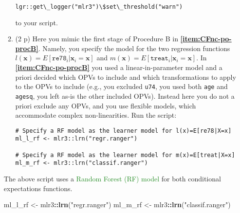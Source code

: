 \documentclass[
]{article}
\newenvironment{Shaded}{\begin{snugshade}}{\end{snugshade}}
\newcommand{\FunctionTok}[1]{\textcolor[rgb]{0.13,0.29,0.53}{\textbf{#1}}}
\newcommand{\NormalTok}[1]{#1}
\newcommand{\OtherTok}[1]{\textcolor[rgb]{0.56,0.35,0.01}{#1}}
\newcommand{\SpecialCharTok}[1]{\textcolor[rgb]{0.81,0.36,0.00}{\textbf{#1}}}
\newcommand{\StringTok}[1]{\textcolor[rgb]{0.31,0.60,0.02}{#1}}
\begin{document}
\begin{enumerate}
\begin{enumerate}
    \texttt{lgr::get\textbackslash{}\_logger("mlr3")\textbackslash{}\$set\textbackslash{}\_threshold("warn")}

    to your script.

\begin{Shaded}
\end{Shaded}
  \item
    (2 p) Here you mimic the first stage of Procedure B in
    \textbf{\ref{item:CFnc-po-procB}}. Namely, you specify the model for
    the two regression functions
    \(l(\mathbf{x})=E[\texttt{re78}_i|\mathbf{x}_{i}=\mathbf{x}]\) and
    \(m(\mathbf{x})=E[\texttt{treat}_i|\mathbf{x}_{i}=\mathbf{x}]\). In
    \textbf{\ref{item:CFnc-po-procB}} you used a linear-in-parameter
    model and a priori decided which OPVs to include and which
    transformations to apply to the OPVs to include (e.g., you excluded
    \texttt{u74}, you used both \texttt{age} and \texttt{agesq}, you
    left as-is the other included OPVs). Instead here you do not a
    priori exclude any OPVs, and you use flexible models, which
    accommodate complex non-linearities. Run the
    script:\label{item:dml-first-stage-models}

\begin{verbatim}
# Specify a RF model as the learner model for l(x)=E[re78|X=x]
ml_l_rf <- mlr3::lrn("regr.ranger")

# Specify a RF model as the learner model for m(x)=E[treat|X=x]
ml_m_rf <- mlr3::lrn("classif.ranger")
\end{verbatim}
  \end{enumerate}

  The above script uses a
  \textcolor{ForestGreen}{Random Forest (RF) model} for both conditional
  expectations functions.

\begin{Shaded}
\begin{Highlighting}[]
\NormalTok{ml\_l\_rf }\OtherTok{\textless{}{-}}\NormalTok{ mlr3}\SpecialCharTok{::}\FunctionTok{lrn}\NormalTok{(}\StringTok{"regr.ranger"}\NormalTok{)}
\NormalTok{ml\_m\_rf }\OtherTok{\textless{}{-}}\NormalTok{ mlr3}\SpecialCharTok{::}\FunctionTok{lrn}\NormalTok{(}\StringTok{"classif.ranger"}\NormalTok{)}
\end{Highlighting}
\end{Shaded}


\end{enumerate}
\end{document}
